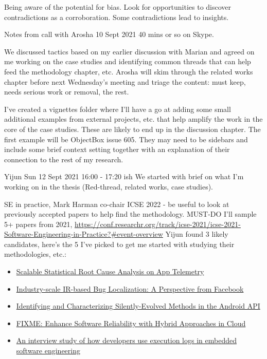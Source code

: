 Being aware of the potential for bias.
Look for opportunities to discover contradictions as a corroboration. 
Some contradictions lead to insights.

 \dotfill
Notes from call with Arosha 10 Sept 2021
40 mins or so on Skype.

We discussed tactics based on my earlier discussion with Marian and agreed on me working on the case studies and identifying common threads that can help feed the methodology chapter, etc. Arosha will skim through the related works chapter before next Wednesday's meeting and triage the content: must keep, needs serious work or removal, the rest.

I've created a vignettes folder where I'll have a go at adding some small additional examples from external projects, etc. that help amplify the work in the core of the case studies. These are likely to end up in the discussion chapter. The first example will be ObjectBox issue 605. They may need to be sidebars and include some brief context setting together with an explanation of their connection to the rest of my research.

 \dotfill
Yijun Sun 12 Sept 2021 16:00 - 17:20 ish
We started with brief on what I'm working on in the thesis (Red-thread, related works, case studies).

SE in practice, Mark Harman co-chair ICSE 2022 - be useful to look at previously accepted papers to help find the methodology. 
MUST-DO I'll sample 5+ papers from 2021, \url{https://conf.researchr.org/track/icse-2021/icse-2021-Software-Engineering-in-Practice?#event-overview} Yijun found 3 likely candidates, here's the 5 I've picked to get me started with studying their methodologies, etc.:
\begin{itemize}
    \item \href{https://arxiv.org/abs/2010.09974}{Scalable Statistical Root Cause Analysis on App Telemetry}
    \item \href{https://arxiv.org/abs/2010.09977}{Industry-scale IR-based Bug Localization: A Perspective from Facebook}
    \item \href{https://github.com/MobileSE/AndroSea/blob/main/paper/CompatibilityIssues.pdf}{Identifying and Characterizing Silently-Evolved Methods in the Android API}
    \item \href{http://arxiv.org/abs/2102.09336}{FIXME: Enhance Software Reliability with Hybrid Approaches in Cloud}
    \item \href{https://www.win.tue.nl/~aserebre/ICSE2021SEIP.pdf}{An interview study of how developers use execution logs in embedded software engineering}
\end{itemize}

